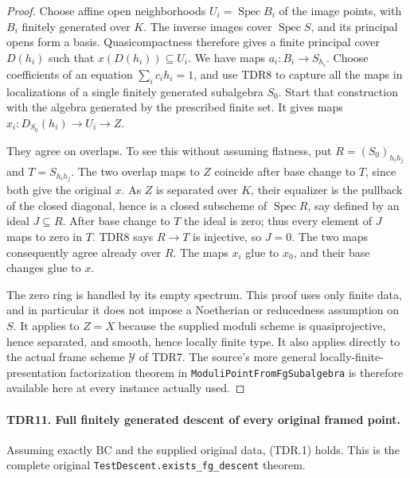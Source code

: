 \begin{proof}
Choose affine open neighborhoods \(U_i=\operatorname{Spec}B_i\)
of the image points, with \(B_i\) finitely generated over \(K\).
The inverse images cover \(\operatorname{Spec}S\), and its
principal opens form a basis.  Quasicompactness therefore gives
a finite principal cover \(D(h_i)\) such that
\(x(D(h_i))\subseteq U_i\).  We have maps
\(a_i:B_i\to S_{h_i}\).  Choose coefficients of an equation
\(\sum_i c_i h_i=1\), and use TDR8 to capture all the maps
in localizations of a single finitely generated subalgebra \(S_0\).
Start that construction with the algebra generated by the
prescribed finite set.  It gives maps
\(x_i:D_{S_0}(h_i)\to U_i\to Z\).

They agree on overlaps.  To see this without assuming flatness,
put \(R=(S_0)_{h_i h_j}\) and \(T=S_{h_i h_j}\).
The two overlap maps to \(Z\) coincide after base change to
\(T\), since both give the original \(x\).
As \(Z\) is separated over \(K\), their equalizer is the
pullback of the closed diagonal, hence is a closed subscheme of
\(\operatorname{Spec}R\), say defined by an ideal \(J\subseteq R\).
After base change to \(T\) the ideal is zero; thus every element
of \(J\) maps to zero in \(T\).  TDR8 says \(R\to T\)
is injective, so \(J=0\).  The two maps consequently agree
already over \(R\).  The maps \(x_i\) glue to \(x_0\),
and their base changes glue to \(x\).

The zero ring is handled by its empty spectrum.  This proof uses
only finite data, and in particular it does not impose a
Noetherian or reducedness assumption on \(S\).  It applies to
\(Z=X\) because the supplied moduli scheme is quasiprojective,
hence separated, and smooth, hence locally finite type.
It also applies directly to the actual frame scheme \(\mathcal Y\)
of TDR7.  The source's more general locally-finite-presentation
factorization theorem in \texttt{ModuliPointFromFgSubalgebra}
is therefore available here at every instance actually used.
\end{proof}

\paragraph{TDR11. Full finitely generated descent of every original framed point.}
\label{claim:TDR11}
Assuming exactly \(\mathrm{BC}\) and the supplied original data,
(TDR.1) holds.  This is the complete original
\texttt{TestDescent.exists\_fg\_descent} theorem.

